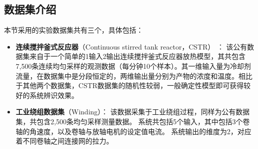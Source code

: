 \subsection{数据集介绍}
本节采用的实验数据集共有三个，具体包括：
\begin{itemize}
    \item \textbf{连续搅拌釜式反应器}（Continuous stirred tank reactor，CSTR） \cite{Demeester2019}：   该公有数据集来自于一个简单的1输入2输出连续搅拌釜式反应器放热模型，其共包含7,500条连续均匀采样的观测数据（每分钟10个样本）。其一维输入量为冷却剂流量，在数据集中是分段恒定的，两维输出量分别为产物的浓度和温度。相比于其他两个数据集，CSTR数据集的随机性较弱，一般确定性模型即可获得较好的系统辨识效果。
    
    \item \textbf{工业绕组数据集}（Winding）\cite{Demeester2019}： 
    该数据采集于工业绕组过程，同样为公有数据集，共包含2,500条均匀采样测量数据。
    系统共包括5个输入，其中包括3个卷轴的角速度，以及卷轴与放轴电机的设定值电流。
    系统输出的维度为2，对应着不同卷轴之间连接网的拉力。
    

\end{itemize}

